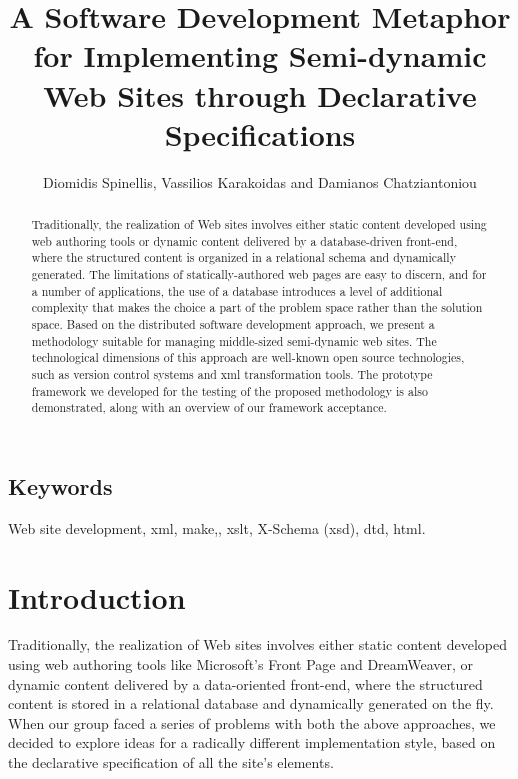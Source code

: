 \documentclass{elsart}
\begin{document}
\begin{frontmatter}

\title{A Software Development Metaphor for Implementing Semi-dynamic Web Sites through Declarative Specifications}

\author{Diomidis Spinellis, Vassilios Karakoidas and Damianos Chatziantoniou}

\address{Department of Management Science and Technology, Athens University of Economics and Business, Greece email:\{dds, bkarak, damianos\}@aueb.gr}

\maketitle

\begin{abstract}
Traditionally, the realization of Web sites involves either
static content developed using web authoring tools or dynamic
content delivered by a database-driven front-end,
where the structured content is organized
in a relational schema and dynamically generated.
The limitations of statically-authored web pages are easy to discern, and
for a number of applications, the use of a database
introduces a level of additional complexity that
makes the choice a part of the problem space rather than the solution space.
Based on the distributed software development approach, we present a methodology suitable for managing 
middle-sized semi-dynamic web sites. The technological dimensions of this
approach are well-known open source technologies, such as version control systems
and {\sc xml} transformation tools. The prototype framework we developed for the testing of the proposed methodology
is also demonstrated, along with an overview of our framework acceptance.
\end{abstract}

\subsection*{Keywords}
Web site development, {\sc xml}, make,, {\sc xslt}, {\sc X-Schema (xsd)}, {\sc dtd}, {\sc html}.

\end{frontmatter}

\section{Introduction}
\label{sec:intro}
Traditionally, the realization of Web sites involves either
static content developed using web authoring tools like
Microsoft's Front Page and DreamWeaver, or dynamic
content delivered by a data-oriented front-end,
where the structured content is stored in a relational database 
and dynamically generated on the fly.
When our group faced a series of problems with both the above approaches,
we decided to explore ideas for a radically different
implementation style, based on the declarative specification
of all the site's elements.
\end{document}
